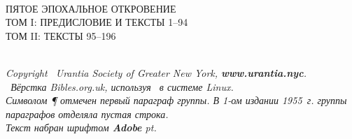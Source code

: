 \begin{center}
\bibcovertitlefont\urantiabook\\[3ex]
\LARGE ПЯТОЕ ЭПОХАЛЬНОЕ ОТКРОВЕНИЕ\\
\ifmultivol
\Large
\ifvoli ТОМ I: ПРЕДИСЛОВИЕ И ТЕКСТЫ 1--94\\\fi
\ifvolii ТОМ II: ТЕКСТЫ 95--196\\\fi
\fi
{}
\titlesepbig\\
\end{center}

\titleframe

\newpage

\begin{center}
\begin{center}\end{center}
\itshape
{}
Copyright \textcopyright\ Urantia Society of Greater New York, {\upshape\bfseries www.urantia.nyc}.\\
\tux\ Вёрстка Bibles.org.uk, используя \XeLaTeX\ в системе Linux.\\
Символом {\upshape \P} отмечен первый параграф группы. В 1-ом издании 1955~г. группы параграфов отделяла пустая строка.\\
Текст набран шрифтом \textbf{Adobe \urantiamainfont} \urantiamainfontsize pt.\\[4pt]
\upshape\normalsize\bfseries\mytoday{}\\
\end{center}

\titleframe
